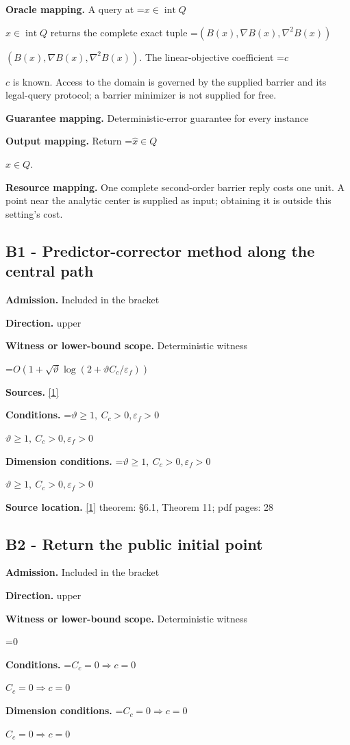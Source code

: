\documentclass[10pt,a4paper]{article}
\newcommand{\AtlasMath}[1]{\par\begingroup\centering\setbox0=\hbox{$\displaystyle #1$}\ifdim\wd0>1.4\linewidth\typeout{ATLAS WIDE FORMULA: \the\wd0}\fi\ifdim\wd0>\linewidth\resizebox{\linewidth}{!}{\box0}\else\box0\fi\par\endgroup}
\newcommand{\AtlasInlineMath}[1]{\begingroup\setbox0=\hbox{$#1$}\ifdim\wd0>.4\linewidth\endgroup\AtlasMath{#1}\else\endgroup$#1$\fi}
\begin{document}
\textbf{Oracle mapping.} A query at \AtlasInlineMath{x\in\operatorname{int}Q} returns the complete exact tuple \AtlasInlineMath{(B(x),\nabla B(x),\nabla^2B(x))}. The linear-objective coefficient \AtlasInlineMath{c} is known. Access to the domain is governed by the supplied barrier and its legal-query protocol; a barrier minimizer is not supplied for free.

\textbf{Guarantee mapping.} Deterministic-error guarantee for every instance

\textbf{Output mapping.} Return \AtlasInlineMath{\widehat{x}\in Q}.

\textbf{Resource mapping.} One complete second-order barrier reply costs one unit. A point near the analytic center is supplied as input; obtaining it is outside this setting's cost.

\subsection{B1 - Predictor-corrector method along the central path}
\textbf{Admission.} Included in the bracket

\textbf{Direction.} upper

\textbf{Witness or lower-bound scope.} Deterministic witness

\AtlasMath{O(1+\sqrt\vartheta\log(2+\vartheta C_c/\varepsilon_f))}
\textbf{Sources.} \href{https://arxiv.org/pdf/2408.11022v1}{[1]}

\textbf{Conditions.} \AtlasInlineMath{\vartheta\ge1,\ C_c>0,\varepsilon_f>0}

\textbf{Dimension conditions.} \AtlasInlineMath{\vartheta\ge1,\ C_c>0,\varepsilon_f>0}

\textbf{Source location.} \href{https://arxiv.org/pdf/2408.11022v1}{[1]} theorem: §6.1, Theorem 11; pdf pages: 28

\subsection{B2 - Return the public initial point}
\textbf{Admission.} Included in the bracket

\textbf{Direction.} upper

\textbf{Witness or lower-bound scope.} Deterministic witness

\AtlasMath{0}
\textbf{Conditions.} \AtlasInlineMath{C_c=0\Rightarrow c=0}

\textbf{Dimension conditions.} \AtlasInlineMath{C_c=0\Rightarrow c=0}
\end{document}
